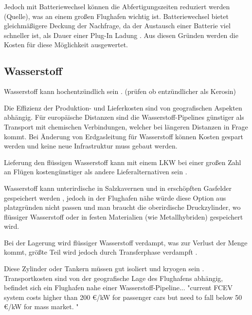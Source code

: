 Jedoch mit Batteriewechsel können die Abfertigungszeiten reduziert werden (Quelle), was an einem großen Flughafen wichtig ist. 
Batteriewechsel bietet gleichmäßigere Deckung der Nachfrage, 
da der Austausch einer Batterie viel schneller ist, als Dauer einer Plug-In Ladung \cite{guo2020aviation}.
Aus diesen Gründen werden die Kosten für diese Möglichkeit ausgewertet.



\subsection{Wasserstoff}

Wasserstoff kann hochentzündlich sein \cite{dalmia2022powering}. (prüfen ob entzündlicher als Kerosin)

Die Effizienz der Produktion- und Lieferkosten sind von geografischen Aspekten abhängig. 
Für europäische Distanzen sind die Wasserstoff-Pipelines günstiger als Transport mit chemischen Verbindungen, 
welcher bei längeren Distanzen in Frage kommt. Bei Änderung von Erdgasleitung für Wasserstoff können Kosten gespart
werden und keine neue Infrastruktur muss gebaut werden.\cite{undertaking2022strategic}

Lieferung den flüssigen Wasserstoff kann mit einem LKW bei einer großen Zahl an Flügen kostengünstiger als andere 
Lieferalternativen sein \cite{schenke2024lh2}.


Wasserstoff kann unterirdische in Salzkavernen und in erschöpften Gasfelder gespeichert werden \cite{undertaking2022strategic}, 
jedoch in der Flughafen nähe würde diese Option aus 
platzgründen nicht passen und man braucht
die oberirdische Druckzylinder, wo flüssiger Wasserstoff oder in festen Materialien (wie Metallhybriden) gespeichert wird.

Bei der Lagerung wird flüssiger Wasserstoff verdampt, was zur Verlust der Menge kommt, 
größte Teil wird jedoch durch Transferphase verdampft \cite{undertaking2022strategic}.

Diese Zylinder oder Tankern müssen gut isoliert und kryogen sein \cite{undertaking2022strategic}.
Transportkosten sind von der geografische Lage des Flughafens abhängig, befindet sich ein Flughafen nahe einer Wasserstoff-Pipeline...
"current FCEV system costs higher than 200 €/kW for passenger cars but need 
to fall below 50 €/kW for mass market. " \cite{undertaking2022strategic}

